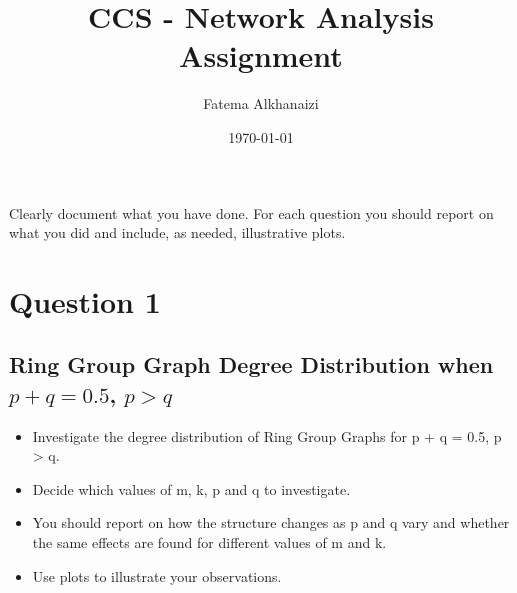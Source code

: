 \documentclass[11pt,a4paper,notitlepage]{article}
\title{CCS - Network Analysis Assignment}
\author{Fatema Alkhanaizi}
\date{\today}
\begin{document}
\graphicspath{ {../distributions/q2/} }

\maketitle

\noindent
Clearly document what you have done. For each question you should report on what you did and include, as needed, illustrative plots.

\section*{Question 1}
\subsection*{Ring Group Graph Degree Distribution when $p + q = 0.5$, $p > q$}
\begin{itemize}
    \item Investigate the degree distribution of Ring Group Graphs for p + q = 0.5, p > q. 
    \item Decide which values of m, k, p and q to investigate. 
    \item You should report on how the structure changes as p and q vary and whether the same effects are found for different values of m and k.
    \item Use plots to illustrate your observations.
\end{itemize}
\end{document}
